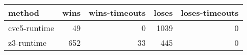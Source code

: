 \begin{tabular}{lrrrr}
\hline
 method       &   wins &   wins-timeouts &   loses &   loses-timeouts \\
\hline
 cvc5-runtime &     49 &               0 &    1039 &                0 \\
 z3-runtime   &    652 &              33 &     445 &                0 \\
\hline
\end{tabular}
